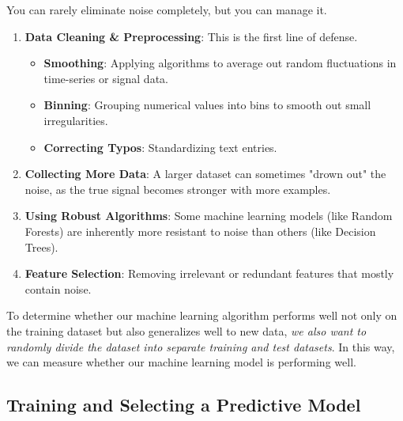 \documentclass[../machine_learning_scikit.tex]{subfiles}
\begin{document}
    \begin{obs}
        You can rarely eliminate noise completely, but you can manage it.

        \begin{enumerate}[label = \textit{(\arabic*)}]
            \item \textbf{Data Cleaning \& Preprocessing}: This is the first line of defense.
            
            \begin{itemize}
                \item \textbf{Smoothing}: Applying algorithms to average out random fluctuations in time-series or signal data.
                
                \item \textbf{Binning}: Grouping numerical values into bins to smooth out small irregularities.
                
                \item \textbf{Correcting Typos}: Standardizing text entries.
            \end{itemize}
            
            \item \textbf{Collecting More Data}: A larger dataset can sometimes "drown out" the noise, as the true signal becomes stronger with more examples.
            
            \item \textbf{Using Robust Algorithms}: Some machine learning models (like Random Forests) are inherently more resistant to noise than others (like Decision Trees).
            
            \item \textbf{Feature Selection}: Removing irrelevant or redundant features that mostly contain noise.
        \end{enumerate}
    \end{obs}

    \begin{idea}
        To determine whether our machine learning algorithm performs well not only on the training dataset but also generalizes well to new data, \textit{we also want to randomly divide the dataset into separate training and test datasets}. In this way, we can measure whether our machine learning model is performing well.
    \end{idea}

    \subsection{Training and Selecting a Predictive Model}
\end{document}
